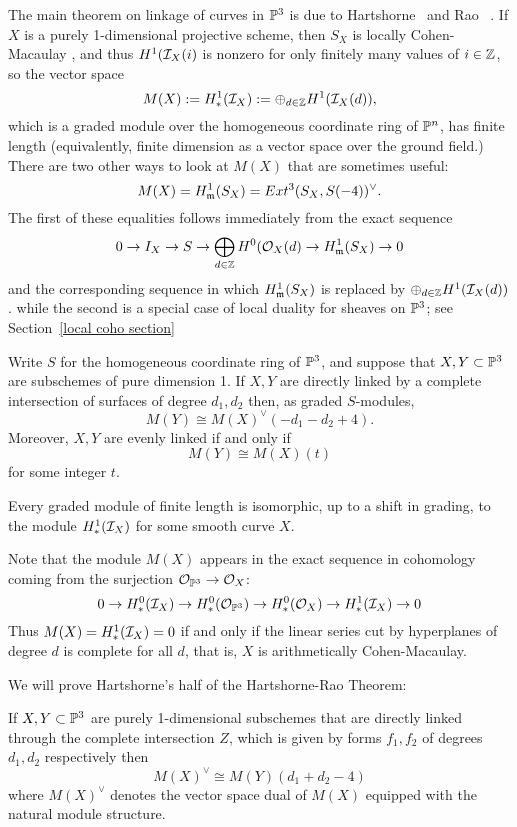 The main theorem on linkage of curves in ${\mathbb P}^3$ is due to Hartshorne~\cite{****} and Rao ~\cite{****}. If $X$ is a purely 1-dimensional projective scheme, then $S_X$ is locally Cohen-Macaulay , and thus $H^1({\mathcal I}_X(i)$ is nonzero for only finitely many values of $i\in {\mathbb Z}$, so
the vector space
$$
M(X) := H^1_*({\mathcal I}_X) := \oplus_{d\in {\mathbb Z}}H^1({\mathcal I}_X(d)),
$$
which is a graded module over the homogeneous coordinate ring of ${\mathbb P}^n$, has finite length (equivalently, finite dimension as a 
vector space over the ground field.) 
There are two other ways to look at $M(X)$ that are sometimes useful:
$$
M(X) = H^1_\mathfrak m(S_X) = Ext^3(S_X,S(-4))^\vee.
$$
The first of these equalities follows immediately from the exact sequence
$$
0\to I_X\to S \to \bigoplus_{d\in {\mathbb Z}} H^0({\mathcal O}_X(d) \to H^1_\mathfrak m(S_X) \to 0
$$
and the corresponding sequence in which $H^1_\mathfrak m(S_X)$ is replaced by $\oplus_{d\in {\mathbb Z}}H^1({\mathcal I}_X(d))$.
while the second is a special case of local duality for sheaves on ${\mathbb P}^3$; see Section~\ref{local coho section}

\begin{theorem}\label{Hartshorne-Rao}
Write $S$ for the homogeneous coordinate ring
of ${\mathbb P}^3$, and suppose that $X,Y\subset {\mathbb P}^3$ are subschemes of pure dimension 1. If $X,Y$ are directly linked by a complete
intersection of surfaces of degree $d_1,d_2$ then, as graded $S$-modules,
$$
M(Y)\cong M(X)^\vee(-d_1-d_2+4).
$$
Moreover, $X,Y$ are evenly linked if and only if 
$$
M(Y) \cong M(X)(t)
$$
 for some integer $t$. 
 
 Every graded module of finite length is isomorphic, up to a shift in grading,
to the module $H^1_*({\mathcal I}_X)$ for some smooth curve $X$.
\end{theorem}
Note that the module $M(X)$ appears in the exact sequence in cohomology coming from the surjection ${\mathcal O}_{{\mathbb P}^3} \to {\mathcal O}_X$:
$$
0\to H^0_*({\mathcal I}_X) \to H^0_*({\mathcal O}_{{\mathbb P}^3}) \to H^0_*({\mathcal O}_X) \to H^1_*({\mathcal I}_X) \to 0
$$
Thus $M(X) = H^1_*({\mathcal I}_X) = 0$ if and only if the linear series cut by hyperplanes of degree $d$ is complete for all $d$, that is,
$X$ is arithmetically Cohen-Macaulay.

We will prove Hartshorne's half of the Hartshorne-Rao Theorem:

\begin{theorem} \label{Hartshorne}
If $X,Y\subset {\mathbb P}^3$ are purely 1-dimensional subschemes that are directly linked 
through the complete intersection $Z$, which is given by forms $f_1, f_2$ of degrees $d_1,d_2$ respectively
then
$$
M(X)^\vee \cong M(Y)(d_1+d_2-4)
$$
where $M(X)^\vee$ denotes the vector space dual of $M(X)$ equipped with the natural module structure.
 \end{theorem}

